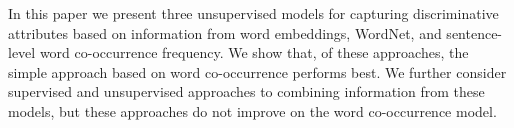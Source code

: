 In this paper we present three unsupervised models for capturing discriminative attributes based on information from word embeddings, WordNet, and sentence-level word co-occurrence frequency.  We show that, of these approaches, the simple approach based on word co-occurrence performs best. We further consider supervised and unsupervised approaches to combining information from these models, but these approaches do not improve on the word co-occurrence model.
